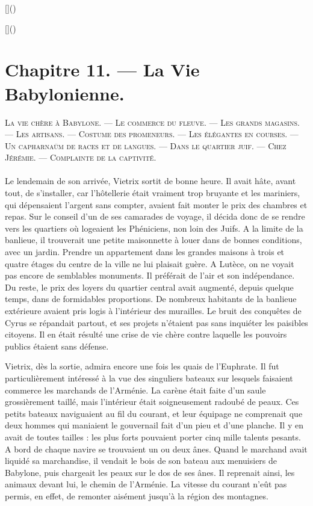\documentclass[a4paper, 11pt, oneside, polutonikogreek, french]{article}
\begin{document}
[]()

[]()
\clearpage
\section{Chapitre 11. --- La Vie Babylonienne.}
\begin{center}
\scshape
\small
La vie chère à Babylone. --- Le commerce du fleuve. --- Les grands magasins. --- Les artisans. --- Costume des promeneurs. --- Les élégantes en courses. --- Un capharnaüm de races et de langues. --- Dans le quartier juif. --- Chez Jérémie. --- Complainte de la captivité.
\end{center}
\paragraph{}
Le lendemain de son arrivée, Vietrix sortit de bonne heure. Il avait hâte, avant tout, de s'installer, car l'hôtellerie était vraiment trop bruyante et les mariniers, qui dépensaient l'argent sans compter, avaient fait monter le prix des chambres et repas. Sur le conseil d'un de ses camarades de voyage, il décida donc de se rendre vers les quartiers où logeaient les Phéniciens, non loin des Juifs. A la limite de la banlieue, il trouverait une petite maisonnette à louer dans de bonnes conditions, avec un jardin. Prendre un appartement dans les grandes maisons à trois et quatre étages du centre de la ville ne lui plaisait guère. A Lutèce, on ne voyait pas encore de semblables monuments. Il préférait de l'air et son indépendance. Du reste, le prix des loyers du quartier central avait augmenté, depuis quelque temps, dans de formidables proportions. De nombreux habitants de la banlieue extérieure avaient pris logis à l'intérieur des murailles. Le bruit des conquêtes de Cyrus se répandait partout, et ses projets n'étaient pas sans inquiéter les paisibles citoyens. Il en était résulté une crise de vie chère contre laquelle les pouvoirs publics étaient sans défense.

\bigskip
\centerline{\EightStarTaper}
\centerline{\EightStarTaper\EightStarTaper}
\bigskip

Vietrix, dès la sortie, admira encore une fois les quais de l'Euphrate. Il fut particulièrement intéressé à la vue des singuliers bateaux sur lesquels faisaient commerce les marchands de l'Arménie. La carène était faite d'un saule grossièrement taillé, mais l'intérieur était soigneusement radoubé de peaux. Ces petits bateaux naviguaient au fil du courant, et leur équipage ne comprenait que deux hommes qui maniaient le gouvernail fait d'un pieu et d'une planche. Il y en avait de toutes tailles : les plus forts pouvaient porter cinq mille talents pesants. A bord de chaque navire se trouvaient un ou deux ânes. Quand le marchand avait liquidé sa marchandise, il vendait le bois de son bateau aux menuisiers de Babylone, puis chargeait les peaux sur le dos de ses ânes. Il reprenait ainsi, les animaux devant lui, le chemin de l'Arménie. La vitesse du courant n'eût pas permis, en effet, de remonter aisément jusqu'à la région des montagnes.
\end{document}
